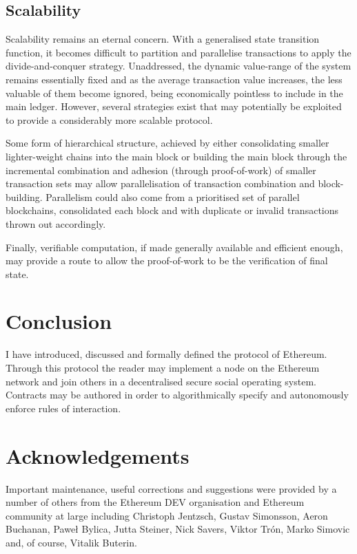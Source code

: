 \documentclass[9pt,oneside]{amsart}
\begin{document}
\begin{multicols}{2}
\subsection{Scalability}

Scalability remains an eternal concern. With a generalised state transition function, it becomes difficult to partition and parallelise transactions to apply the divide-and-conquer strategy. Unaddressed, the dynamic value-range of the system remains essentially fixed and as the average transaction value increases, the less valuable of them become ignored, being economically pointless to include in the main ledger. However, several strategies exist that may potentially be exploited to provide a considerably more scalable protocol.

Some form of hierarchical structure, achieved by either consolidating smaller lighter-weight chains into the main block or building the main block through the incremental combination and adhesion (through proof-of-work) of smaller transaction sets may allow parallelisation of transaction combination and block-building. Parallelism could also come from a prioritised set of parallel blockchains, consolidated each block and with duplicate or invalid transactions thrown out accordingly.

Finally, verifiable computation, if made generally available and efficient enough, may provide a route to allow the proof-of-work to be the verification of final state.

\section{Conclusion} \label{ch:conclusion}

I have introduced, discussed and formally defined the protocol of Ethereum. Through this protocol the reader may implement a node on the Ethereum network and join others in a decentralised secure social operating system. Contracts may be authored in order to algorithmically specify and autonomously enforce rules of interaction.

\section{Acknowledgements}

Important maintenance, useful corrections and suggestions were provided by a number of others from the Ethereum DEV organisation and Ethereum community at large including Christoph Jentzsch, Gustav Simonsson, Aeron Buchanan, Pawe\l{} Bylica, Jutta Steiner, Nick Savers, Viktor Tr\'{o}n, Marko Simovic and, of course, Vitalik Buterin.




\end{multicols}
\end{document}
